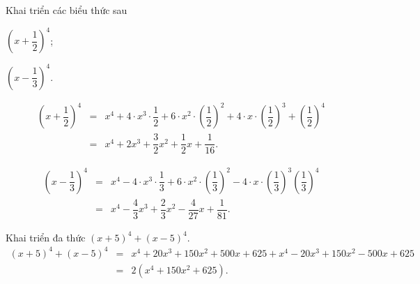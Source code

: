 \begin{bt}%
	Khai triển các biểu thức sau
	\begin{listEX}[2]
		\item $\left (x+\dfrac{1}{2} \right )^4$;
		\item $\left (x-\dfrac{1}{3} \right )^4$.
	\end{listEX}
	\loigiai
	{
		\begin{listEX}[1]
			\item \begin{eqnarray*}
				\left (x+\dfrac{1}{2} \right )^4&=&x^4+4\cdot x^3\cdot \dfrac{1}{2}+6\cdot x^2\cdot \left (\dfrac{1}{2} \right )^2+4\cdot x\cdot \left (\dfrac{1}{2} \right )^3+ \left (\dfrac{1}{2} \right )^4\\&=&x^4+2x^3+\dfrac{3}{2}x^2+\dfrac{1}{2}x+\dfrac{1}{16}.
			\end{eqnarray*}
			\item \begin{eqnarray*}
				\left (x-\dfrac{1}{3} \right )^4&=&x^4-4\cdot x^3\cdot\dfrac{1}{3}+6\cdot x^2\cdot \left (\dfrac{1}{3} \right )^2-4\cdot x\cdot \left (\dfrac{1}{3} \right )^3 \left (\dfrac{1}{3} \right )^4\\&=&x^4-\dfrac{4}{3}x^3+\dfrac{2}{3}x^2-\dfrac{4}{27}x+\dfrac{1}{81}.
			\end{eqnarray*}
		\end{listEX}
	}
\end{bt}

\begin{bt}%
	Khai triển đa thức $(x+5)^4+(x-5)^4$.
	\loigiai
	{
		\begin{eqnarray*}
			(x+5)^4+(x-5)^4&=&x^4+20x^3+150x^2+500x+625+x^4-20x^3+150x^2-500x+625\\&=&2\left (x^4+150x^2+625 \right ).
		\end{eqnarray*}
	}
\end{bt}

